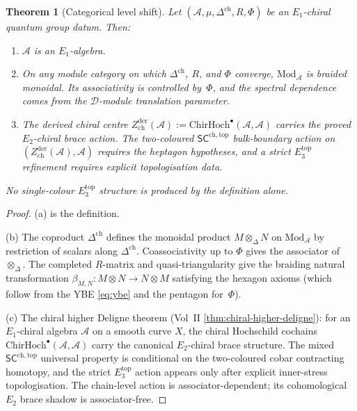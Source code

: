 \documentclass[11pt]{article}
\newtheorem{theorem}{Theorem}[section]
\theoremstyle{remark}
\providecommand{\cA}{\mathcal{A}}
\providecommand{\cD}{\mathcal{D}}
\providecommand{\Mod}{\mathrm{Mod}}
\providecommand{\ChirHoch}{\mathrm{ChirHoch}}
\providecommand{\SCchtop}{\mathsf{SC}^{\mathrm{ch},\mathrm{top}}}
\begin{document}
\begin{theorem}[Categorical level shift]\label{thm:level-shift}
Let $(\cA,\mu,\Delta^{\mathrm{ch}},R,\Phi)$ be an $E_1$-chiral quantum
group datum.
Then:
\begin{enumerate}[label=\textup{(\alph*)}]
\item $\cA$ is an $E_1$-algebra.
\item On any module category on which $\Delta^{\mathrm{ch}}$, $R$, and
  $\Phi$ converge, $\Mod_\cA$ is braided monoidal.  Its associativity is
  controlled by~$\Phi$, and the spectral dependence comes from the
  $\cD$-module translation parameter.
\item The derived chiral centre $Z^{\mathrm{der}}_{\mathrm{ch}}(\cA)
  := \ChirHoch^\bullet(\cA, \cA)$ carries the proved $E_2$-chiral brace
  action.  The two-coloured $\SCchtop$ bulk-boundary action on
  $(Z^{\mathrm{der}}_{\mathrm{ch}}(\cA),\cA)$ requires the heptagon
  hypotheses, and a strict $E_3^{\mathrm{top}}$ refinement requires
  explicit topologisation data.
\end{enumerate}
No single-colour $E_3^{\mathrm{top}}$ structure is produced by the
definition alone.
\end{theorem}

\begin{proof}
(a) is the definition.

(b) The coproduct $\Delta^{\mathrm{ch}}$ defines the monoidal product
$M \otimes_\Delta N$ on $\Mod_\cA$ by restriction of scalars
along $\Delta^{\mathrm{ch}}$.  Coassociativity up to $\Phi$ gives the
associator of $\otimes_\Delta$.  The completed $R$-matrix and
quasi-triangularity give the braiding natural transformation
$\beta_{M,N} \colon M \otimes N \to N \otimes M$
satisfying the hexagon axioms (which follow from the YBE
\eqref{eq:ybe} and the pentagon for~$\Phi$).

(c) The chiral higher Deligne theorem (Vol~II
\ref*{thm:chiral-higher-deligne}): for an $E_1$-chiral algebra
$\cA$ on a smooth curve $X$, the chiral Hochschild cochains
$\ChirHoch^\bullet(\cA, \cA)$ carry the canonical $E_2$-chiral brace
structure.  The mixed $\SCchtop$ universal property is conditional on
the two-coloured cobar contracting homotopy, and the strict
$E_3^{\mathrm{top}}$ action appears only after explicit inner-stress
topologisation.  The chain-level action is associator-dependent; its
cohomological $E_2$ brace shadow is associator-free.
\end{proof}


\end{document}
